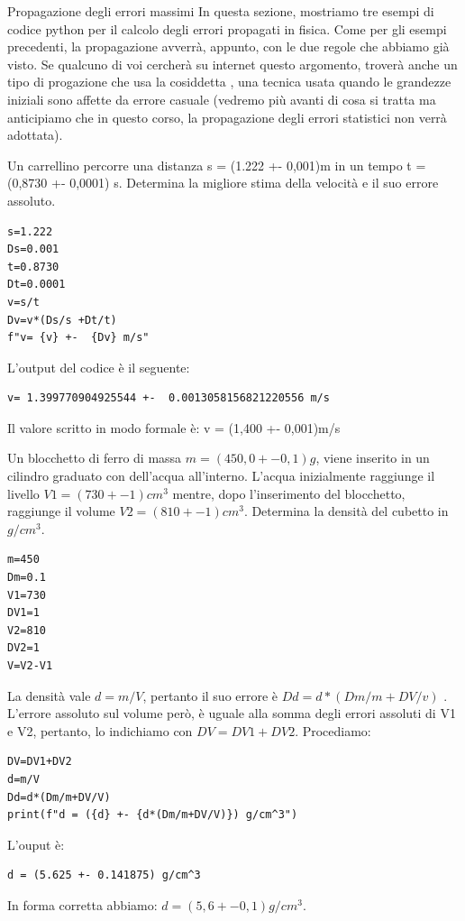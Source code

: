 \documentclass[12pt,a4paper,oneside]{book}
\makeatletter
\newcounter{testexample} %
\renewcommand{\subsection}{\@startsection {subsection}{2}{\z@}
{-3ex \@plus -0.1ex \@minus -.4ex}
{0.5ex \@plus.2ex }
{\color[rgb]{0.141,0.596,0.749}\normalfont\sffamily\bfseries}}
\theoremstyle{esercizio}
\makeatother
\begin{document}
\subsection{Propagazione degli errori massimi}
In questa sezione, mostriamo tre esempi di codice python per il calcolo degli errori propagati in fisica. Come per gli esempi precedenti, la propagazione avverrà, appunto, con le due regole che abbiamo già visto. Se qualcuno di voi cercherà su internet questo argomento, troverà  anche un tipo di progazione che usa la cosiddetta , una tecnica usata quando le grandezze iniziali sono affette da errore casuale (vedremo più avanti di cosa si tratta ma anticipiamo che in questo corso, la propagazione degli errori statistici non verrà adottata).


\begin{testexample}
Un carrellino percorre una distanza s = (1.222 +- 0,001)m in un tempo t = (0,8730 +- 0,0001) s. Determina la migliore stima della velocità e il suo errore assoluto.

\begin{verbatim}
s=1.222
Ds=0.001
t=0.8730
Dt=0.0001
v=s/t
Dv=v*(Ds/s +Dt/t)
f"v= {v} +-  {Dv} m/s"
\end{verbatim}
L'output del codice è il seguente:
\begin{verbatim}
v= 1.399770904925544 +-  0.0013058156821220556 m/s
\end{verbatim}
Il valore scritto in modo formale è: v = (1,400 +- 0,001)m/s
\end{testexample}

\begin{testexample}
Un blocchetto di ferro di massa $m = (450,0 +- 0,1) g$, viene inserito in un cilindro graduato con dell'acqua all'interno. L'acqua inizialmente raggiunge il livello $V1 = ( 730 +- 1) cm^3$ mentre, dopo l'inserimento del blocchetto, raggiunge il volume $V2= (810 +-1 ) cm^3$. Determina la densità del cubetto in $g/cm^3$.
\begin{verbatim}
m=450
Dm=0.1
V1=730
DV1=1
V2=810
DV2=1
V=V2-V1
\end{verbatim}
La densità vale $d = m/V$, pertanto il suo errore è $Dd = d*(Dm/m + DV/v)$ . L'errore assoluto sul volume però, è uguale alla somma degli errori assoluti di V1 e V2, pertanto, lo indichiamo con $DV = DV1+DV2$. Procediamo:
\begin{verbatim}
DV=DV1+DV2
d=m/V
Dd=d*(Dm/m+DV/V)
print(f"d = ({d} +- {d*(Dm/m+DV/V)}) g/cm^3")
\end{verbatim}
L'ouput è:
\begin{verbatim}
d = (5.625 +- 0.141875) g/cm^3
\end{verbatim}
In forma corretta abbiamo: $d = (5,6 +- 0,1) g/cm^3$.

\end{testexample}
\end{document}
